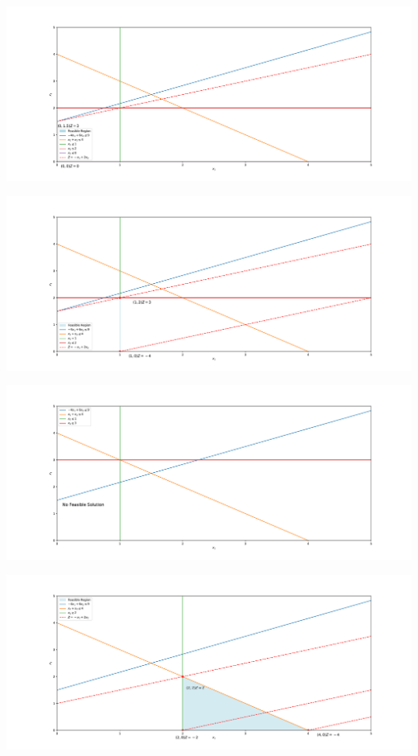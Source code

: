 \begin{center}
    \includegraphics[width = \textwidth]{Exercice/PY/EX2/ex2.4.pdf}
\end{center}
\begin{center}
    \includegraphics[width = \textwidth]{Exercice/PY/EX2/ex2.5.pdf}
\end{center}
\begin{center}
    \includegraphics[width = \textwidth]{Exercice/PY/EX2/ex2.6.pdf}
\end{center}
\begin{center}
    \includegraphics[width = \textwidth]{Exercice/PY/EX2/ex2.7.pdf}
\end{center}

